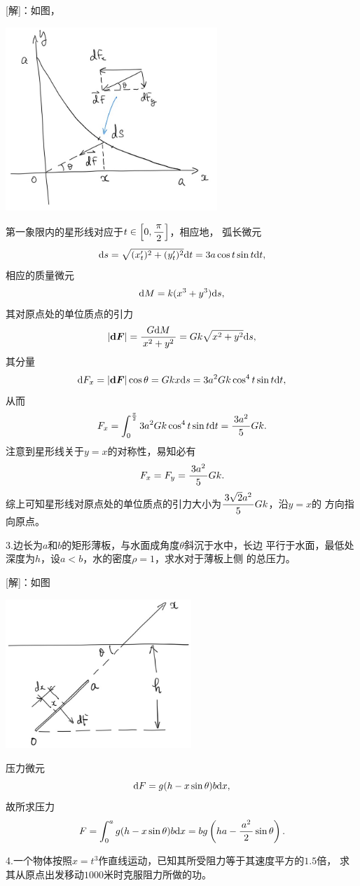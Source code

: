 [解]：如图，
\begin{center}
	\includegraphics[width=8cm]{./images/ch6/starGr.jpg}
\end{center}
第一象限内的星形线对应于$t\in\left[0,\displaystyle\frac{\,{\pi}\,}{\,{2}\,}\right]$，相应地，
弧长微元
$$\mathrm{d} s=\sqrt{(x'_t)^2+(y'_t)^2}\mathrm{d} t=3a\cos t\sin t\mathrm{d} t,$$
相应的质量微元
$$\mathrm{d} M=k(x^3+y^3)\mathrm{d} s,$$
其对原点处的单位质点的引力
$$|\bm{\mathrm{d} F}|=\displaystyle\frac{\,{G\mathrm{d} M}\,}{\,{x^2+y^2}\,}=Gk\sqrt{x^2+y^2}\mathrm{d} s,$$
其分量
$$\mathrm{d} F_x=|\bm{\mathrm{d} F}|\cos\theta=Gkx\mathrm{d} s
=3a^2Gk\cos^4t\sin t\mathrm{d} t,$$
从而
$$F_x=\displaystyle\int_0^{\frac{\pi}2}3a^2Gk\cos^4t\sin t\mathrm{d} t=\displaystyle\frac{\,{3a^2}\,}{\,{5}\,}Gk.$$
注意到星形线关于$y=x$的对称性，易知必有
$$F_x=F_y=\displaystyle\frac{\,{3a^2}\,}{\,{5}\,}Gk.$$
综上可知星形线对原点处的单位质点的引力大小为$\displaystyle\frac{\,{3\sqrt2a^2}\,}{\,{5}\,}Gk$，沿$y=x$的
方向指向原点。\fin

\bs

3.边长为$a$和$b$的矩形薄板，与水面成角度$\theta$斜沉于水中，长边
平行于水面，最低处深度为$h$，设$a<b$，水的密度$\rho=1$，求水对于薄板上侧
的总压力。

[解]：如图
\begin{center}
	\includegraphics[width=7cm]{./images/ch6/waterPlane.jpg}
\end{center}
压力微元
$$\mathrm{d} F=g(h-x\sin\theta)b\mathrm{d} x,$$
故所求压力
$$F=\displaystyle\int_0^ag(h-x\sin\theta)b\mathrm{d} x
=bg\left(ha-\displaystyle\frac{\,{a^2}\,}{\,{2}\,}\sin\theta\right).$$
\fin

4.一个物体按照$x=t^3$作直线运动，已知其所受阻力等于其速度平方的$1.5$倍，
求其从原点出发移动$1000$米时克服阻力所做的功。

